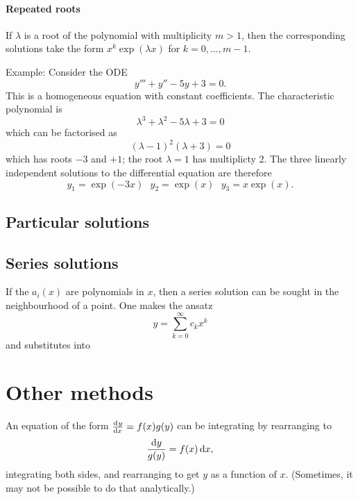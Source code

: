 \documentclass{article}
\begin{document}
\paragraph{Repeated roots} If $\lambda$ is a root of the polynomial with multiplicity
$m>1$, then the corresponding solutions take the form $x^k \exp(\lambda x)$ for
$k=0,\dots,m-1$.

Example: Consider the ODE
$$ y''' + y'' - 5y + 3 = 0. $$
This is a homogeneous equation with constant coefficients. The characteristic
polynomial is 
$$ \lambda^3 + \lambda^2 - 5\lambda + 3 = 0 $$
which can be factorised as 
$$ (\lambda-1)^2 (\lambda+3) = 0 $$
which has roots $-3$ and $+1$; the root $\lambda=1$ has multiplicty 2. The three
linearly independent solutions to the differential equation are therefore
$$ y_1 = \exp(-3x) \text{ } y_2 = \exp(x) \text{ } y_3 = x\exp(x). $$

\subsection{Particular solutions}

\subsection{Series solutions}

If the $a_i(x)$ are polynomials in $x$, then a series solution can be sought in
the neighbourhood of a point. One makes the ansatz 
$$ y = \sum_{k=0}^\infty c_k x^k $$
and substitutes into 

\section{Other methods}

An equation of the form $\od{y}{x} = f(x)g(y)$ can be integrating by rearranging to 
$$ \frac{\dif y}{g(y)} = f(x)\dif x, $$
integrating both sides, and rearranging to get $y$ as a function of $x$.
(Sometimes, it may not be possible to do that analytically.)
\end{document}

